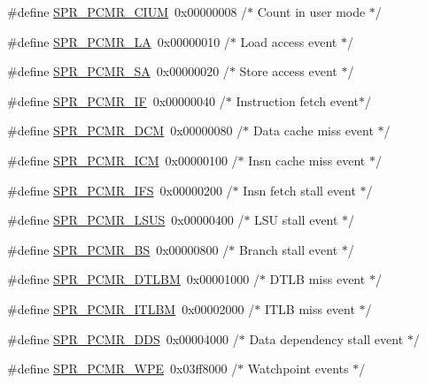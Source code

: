 \begin{DoxyCompactItemize}
\item 
\#define \hyperlink{spr-defs_8h_a6e1547aaac0dc7c6f9008a12f7ef3d6d}{\-S\-P\-R\-\_\-\-P\-C\-M\-R\-\_\-\-C\-I\-U\-M}~0x00000008  /$\ast$ Count in user mode $\ast$/
\item 
\#define \hyperlink{spr-defs_8h_a88ad511f2eabd6a8b7690931fa762bf5}{\-S\-P\-R\-\_\-\-P\-C\-M\-R\-\_\-\-L\-A}~0x00000010  /$\ast$ Load access event $\ast$/
\item 
\#define \hyperlink{spr-defs_8h_ac1163a785444109eba81b954ecb17981}{\-S\-P\-R\-\_\-\-P\-C\-M\-R\-\_\-\-S\-A}~0x00000020  /$\ast$ Store access event $\ast$/
\item 
\#define \hyperlink{spr-defs_8h_a27e105868456bd33254d40c687832be3}{\-S\-P\-R\-\_\-\-P\-C\-M\-R\-\_\-\-I\-F}~0x00000040  /$\ast$ Instruction fetch event$\ast$/
\item 
\#define \hyperlink{spr-defs_8h_a75d55e9b8fc6e1550061d1eb1991ff06}{\-S\-P\-R\-\_\-\-P\-C\-M\-R\-\_\-\-D\-C\-M}~0x00000080  /$\ast$ Data cache miss event $\ast$/
\item 
\#define \hyperlink{spr-defs_8h_a8d87b7451eef00675257510e2059bf19}{\-S\-P\-R\-\_\-\-P\-C\-M\-R\-\_\-\-I\-C\-M}~0x00000100  /$\ast$ Insn cache miss event $\ast$/
\item 
\#define \hyperlink{spr-defs_8h_af94f5995b2c4509ff170e358d3fa3bac}{\-S\-P\-R\-\_\-\-P\-C\-M\-R\-\_\-\-I\-F\-S}~0x00000200  /$\ast$ Insn fetch stall event $\ast$/
\item 
\#define \hyperlink{spr-defs_8h_ad522b7f53055c947717a9632dc8440ea}{\-S\-P\-R\-\_\-\-P\-C\-M\-R\-\_\-\-L\-S\-U\-S}~0x00000400  /$\ast$ L\-S\-U stall event $\ast$/
\item 
\#define \hyperlink{spr-defs_8h_ae04a6aa21a52f2a854d0fa47d722b934}{\-S\-P\-R\-\_\-\-P\-C\-M\-R\-\_\-\-B\-S}~0x00000800  /$\ast$ Branch stall event $\ast$/
\item 
\#define \hyperlink{spr-defs_8h_a88a87a2fdf99f13275b77027786e6f9b}{\-S\-P\-R\-\_\-\-P\-C\-M\-R\-\_\-\-D\-T\-L\-B\-M}~0x00001000  /$\ast$ D\-T\-L\-B miss event $\ast$/
\item 
\#define \hyperlink{spr-defs_8h_a0204309da4e43af6bff2b4c0b70b673f}{\-S\-P\-R\-\_\-\-P\-C\-M\-R\-\_\-\-I\-T\-L\-B\-M}~0x00002000  /$\ast$ I\-T\-L\-B miss event $\ast$/
\item 
\#define \hyperlink{spr-defs_8h_a4021bb766e02f2905c0a168169500bfa}{\-S\-P\-R\-\_\-\-P\-C\-M\-R\-\_\-\-D\-D\-S}~0x00004000  /$\ast$ Data dependency stall event $\ast$/
\item 
\#define \hyperlink{spr-defs_8h_a11742571e7928e04eaf87c047d544734}{\-S\-P\-R\-\_\-\-P\-C\-M\-R\-\_\-\-W\-P\-E}~0x03ff8000  /$\ast$ Watchpoint events $\ast$/

\end{DoxyCompactItemize}
